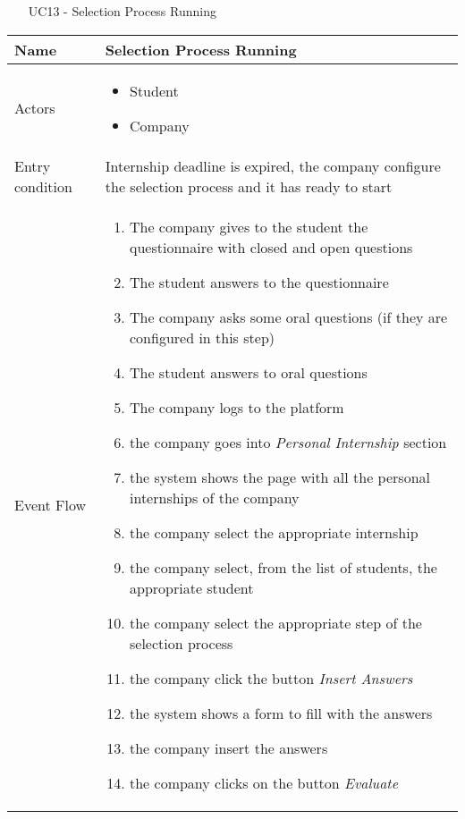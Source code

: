 				\begin{table} [H]
					\centering
					\begin{itemize}
						\item [UC13] - Selection Process Running
					\end{itemize}
					\begin{tabular}{|| P{7.5cm} | P{7.5cm} ||}
						\hline
						Name & Selection Process Running \\
						\hline
						Actors & \parbox{5cm}{\begin{itemize}
								\item Student
								\item Company
							\end{itemize}
						} \\
						\hline
						Entry condition & Internship deadline is expired, the company configure the selection process and it has ready to start \\
						\hline
						Event Flow & \parbox{5cm}{\begin{enumerate}
								\item The company gives to the student the questionnaire with closed and open questions
								\item The student answers to the questionnaire
								\item The company asks some oral questions (if they are configured in this step)
								\item The student answers to oral questions
								\item The company logs to the platform 
								\item the company goes into \textit{Personal Internship} section
								\item the system shows the page with all the personal internships of the company
								\item the company select the appropriate internship 
								\item the company select, from the list of students, the appropriate student
								\item the company select the appropriate step of the selection process
								\item the company click the button \textit{Insert Answers}
								\item the system shows a form to fill with the answers
								\item the company insert the answers
								\item the company clicks on the button \textit{Evaluate}

\end{enumerate}}
\end{tabular}
\end{table}
